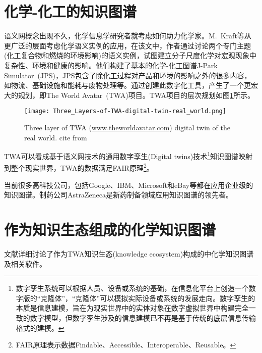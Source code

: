 \section{化学-化工的知识图谱}
语义网概念出现不久，化学信息学研究者就考虑如何助力化学家。\textrm{M.~Kraft}等从更广泛的层面考虑化学语义实例的应用，在该文中，作者通过讨论两个专门主题(化工复合物和燃烧的环境影响)的语义实例，试图建立分子尺度化学对宏观现象中复杂性、环境和健康的影响。他们构建了基本的化学-化工图谱\textrm{J-Park Simulator~(JPS)}，\textrm{JPS}包含了除化工过程对产品和环境的影响之外的很多内容，如物流、基础设施和能耗与废物处理等。通过创建此数字化工具，产生了一个更宏大的规划，即\textrm{The World Avatar~(TWA)}项目。\textrm{TWA}项目的层次规划如图\ref{Fig:Three_Layers-of-TWA}所示。
\begin{figure}[h!]
\centering
\texttt{[image: Three\_Layers-of-TWA-digital-twin-real\_world.png]}
\caption{\small\textrm{Three layer of TWA (\url{www.theworldavatar.com}) digital twin of the real world. cite from\cite{ACR56-128_2023}}}%
\label{Fig:Three_Layers-of-TWA}
\end{figure}
\textrm{TWA}可以看成基于语义网技术的通用数字孪生\textrm{(Digital twins)}技术\footnote{数字孪生系统可以根据人员、设备或系统的基础，在信息化平台上创造一个数字版的“克隆体”，“克隆体”可以模拟实际设备或系统的发展走向。数字孪生的本质是信息建模，旨在为现实世界中的实体对象在数字虚拟世界中构建完全一致的数字模型，但数字孪生涉及的信息建模已不再是基于传统的底层信息传输格式的建模。}知识图谱映射到整个现实世界，\textrm{TWA}的数据满足\textrm{FAIR}原理\footnote{\textrm{FAIR}原理表示数据\textrm{Findable}、\textrm{Accessible}、\textrm{Interoperable}、\textrm{Reusable}。}。

当前很多高科技公司，包括\textrm{Google}、\textrm{IBM}、\textrm{Microsoft}和\textrm{eBay}等都在应用企业级的知识图谱。制药公司\textrm{AstraZeneca}是新药制备领域应用知识图谱的领先者。

\section{作为知识生态组成的化学知识图谱}
文献\cite{ACR56-128_2023}详细讨论了作为\textrm{TWA}知识生态\textrm{(knowledge ecosystem)}构成的中化学知识图谱及相关软件。
